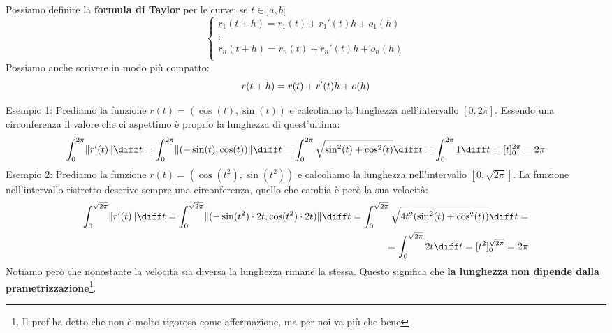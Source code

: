 
Possiamo definire la \textbf{formula di Taylor} per le curve: se $t \in ]a, b[$
\begin{equation*}
	\begin{cases}
		r_1(t + h) = r_1(t) + r_1'(t)h + o_1(h)\\
		\vdots\\
		r_n(t + h) = r_n(t) + r_n'(t)h + o_n(h)\\
	\end{cases}
\end{equation*}
Possiamo anche scrivere in modo più compatto:
\begin{equation*}
	r(t + h) = r(t) + r'(t)h + o(h)\\
\end{equation*}

Esempio 1: Prediamo la funzione $r(t) = (\cos(t), \sin(t))$ e calcoliamo la 
lunghezza nell'intervallo $[0, 2\pi]$. Essendo una circonferenza il valore che 
ci aspettimo è proprio la lunghezza di quest'ultima:
\begin{equation*}
	\int_0^{2\pi} \lVert r'(t) \rVert \diff t = \int_0^{2\pi} \lVert (
	-\sin(t), \cos(t)) \rVert \diff t = \int_0^{2\pi} \sqrt{\sin^2(t) + 
	\cos^2(t)} \diff t = \int_0^{2\pi} 1 \diff t =  [t]_0^{2\pi} = 2\pi
\end{equation*}
Esempio 2: Prediamo la funzione $r(t) = (\cos(t^2), \sin(t^2))$ e calcoliamo 
la lunghezza nell'intervallo $[0, \sqrt{2\pi}]$. La funzione nell'intervallo 
ristretto descrive sempre una circonferenza, quello che cambia è però la sua 
velocità:
\begin{align*}
	\int_0^{\sqrt{2\pi}} \lVert r'(t) \rVert \diff t = \int_0^{\sqrt{2\pi}} 
	\lVert (-\sin(t^2) \cdot 2t, \cos(t^2) \cdot 2t) \rVert \diff t = 
	\int_0^{\sqrt{2\pi}} \sqrt{4t^2(\sin^2(t) + \cos^2(t))} \diff t = \\
	= \int_0^{\sqrt{2\pi}} 2t \diff t =  [t^2]_0^{\sqrt{2\pi}} = 2\pi
\end{align*}
Notiamo però che nonostante la velocita sia diversa la lunghezza rimane la 
stessa. Questo significa che \textbf{la lunghezza non dipende dalla 
prametrizzazione}\footnote{Il prof ha detto che non è molto rigorosa come 
affermazione, ma per noi va più che bene}.

